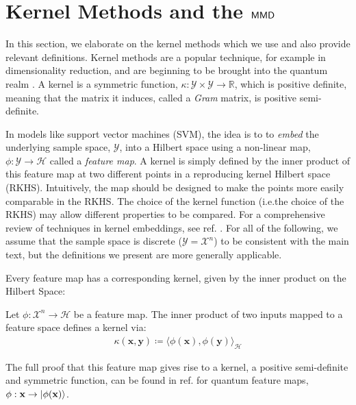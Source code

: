 
\section{Kernel Methods and the \texorpdfstring{$\operatorname{\textsf{MMD}}$}{MMD}}\label{supp_matt:kernelmethods_mmd}
In this section, we elaborate on the kernel methods which we use and also provide relevant definitions. Kernel methods are a popular technique, for example in dimensionality reduction, and are beginning to be brought into the quantum realm . A kernel is a symmetric function, $\kappa:\mathcal{Y}\times\mathcal{Y} \rightarrow \mathbb{R}$, which is positive definite, meaning that the matrix it induces, called a \textit{Gram} matrix, is positive semi-definite.

In models like support vector machines (SVM), the idea is to to \emph{embed} the underlying sample space, $\mathcal{Y}$, into a Hilbert space using a non-linear map, $\phi:\mathcal{Y} \rightarrow \mathcal{H}$ called a \emph{feature map}. A kernel is simply defined by the inner product of this feature map at two different points in a reproducing kernel Hilbert space (RKHS). Intuitively, the map should be designed to make the points more easily comparable in the RKHS.  The choice of the kernel function (i.e.\@ the choice of the RKHS) may allow different properties to be compared.  For a comprehensive review of techniques in kernel embeddings, see ref. . For all of the following, we assume that the sample space is discrete ($\mathcal{Y} = \mathcal{X}^n$) to be consistent with the main text, but the definitions we present are more generally applicable.

Every feature map has a corresponding kernel, given by the inner product on the Hilbert Space:
\begin{theorem}
    Let $\phi: \mathcal{X}^n \rightarrow \mathcal{H}$ be a feature map. The inner product of two inputs mapped to a feature space defines a kernel via:
    \begin{align}
        \kappa(\mathbf{x},\mathbf{y})  \coloneqq \langle\phi(\mathbf{x}),\phi(\mathbf{y}) \rangle_{\mathcal{H}} \label{featurekernel}
    \end{align}
\end{theorem}

The full proof that this feature map gives rise to a kernel, a positive semi-definite and symmetric function, can be found in ref. for quantum feature maps, $\phi :\mathbf{x}\rightarrow \ket{\phi(\mathbf{x})}$.


